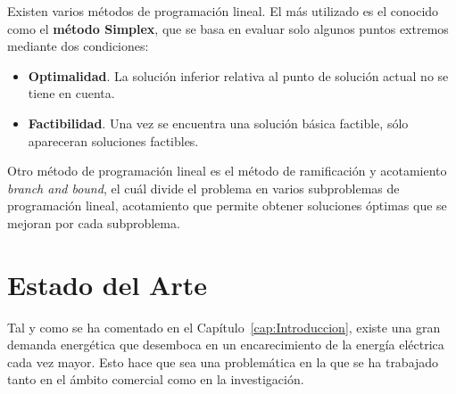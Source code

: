 Existen varios métodos de programación lineal. El más utilizado es el conocido como el \textbf{método Simplex}, que se basa en evaluar solo algunos puntos extremos mediante dos condiciones:
\begin{itemize}
\item \textbf{Optimalidad}. La solución inferior relativa al punto de solución actual no se tiene en cuenta.
  \item \textbf{Factibilidad}. Una vez se encuentra una solución básica factible, sólo apareceran soluciones factibles.
\end{itemize}
Otro método de programación lineal es el método de ramificación y acotamiento \textit{branch and bound}, el cuál divide el problema en varios subproblemas de programación lineal, acotamiento que permite obtener soluciones óptimas que se mejoran por cada subproblema.\\

\section{Estado del Arte}
Tal y como se ha comentado en el Capítulo~\ref{cap:Introduccion}, existe una gran demanda energética que desemboca en un encarecimiento de la energía eléctrica cada vez mayor. Esto hace que sea una problemática en la que se ha trabajado tanto en el ámbito comercial como en la investigación.\\

